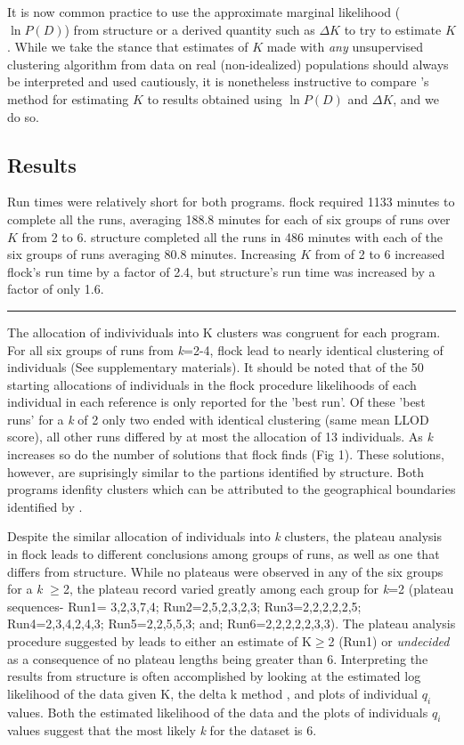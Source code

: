  

It is now common practice to use the approximate marginal likelihood ($\ln P(D)$) from {\sc structure}
or a derived quantity such as $\Delta K$ \citep{Evannoetal2005} to try to estimate $K$.
While we take the stance that estimates of $K$ made with {\em any} unsupervised clustering algorithm
from data on real (non-idealized) populations should always be interpreted and used
cautiously, it is nonetheless instructive to compare \citet{Duc&Tur2012}'s method for
estimating $K$ to results obtained using $\ln P(D)$ and $\Delta K$, and we do so. 


\subsection*{Results} 
Run times were relatively short for both programs. {\sc flock} 
required 1133 minutes to complete all the runs, averaging 188.8 minutes for 
each of six groups of runs over $K$ from 2 to 6. {\sc structure} completed all the runs in 
486 minutes with each of the six groups of runs averaging 80.8 minutes. Increasing
$K$ from of 2 to 6 increased {\sc flock}'s run time by a factor of 2.4, but {\sc structure}'s
run time was increased by a factor of only 1.6.  
\hrule

The allocation of indivividuals into K clusters was congruent for each program. For all six groups 
of runs from \textit{k}=2-4, {\sc flock} lead to nearly identical clustering of individuals 
(See supplementary materials). It should be noted
that of the 50 starting allocations of individuals in the {\sc flock} procedure likelihoods of each individual in 
each reference is only reported for the 
 'best run'. Of these 'best runs' for a \textit{k} of 2 only two  
ended with identical clustering (same mean LLOD score), all other runs 
differed by at most the allocation of 13 individuals. As \textit{k} increases so do the number of solutions
that {\sc flock} finds (Fig 1). These solutions, however, are suprisingly similar to
 the partions identified by {\sc structure}. Both programs idenfity clusters 
which can be attributed to the geographical boundaries identified by \citet{Garzaetal_norcal}.

Despite the similar allocation of individuals into \textit{k} clusters, the 
plateau analysis in {\sc flock} leads to different conclusions among groups of runs, as well as 
one that differs from {\sc structure}. While no plateaus were observed in any of the six groups 
for a \textit{k} $\geq$2, the plateau record varied greatly among each
 group for \textit{k}=2 (plateau  sequences- Run1= 3,2,3,7,4; Run2=2,5,2,3,2,3; Run3=2,2,2,2,2,5; 
Run4=2,3,4,2,4,3; Run5=2,2,5,5,3; and; Run6=2,2,2,2,2,3,3). The plateau analysis 
procedure suggested by \citet{Duc&Tur2012} leads to 
either an estimate of K$\geq$2 (Run1) or \textit{undecided} as a consequence of no plateau 
lengths being greater than 6. Interpreting the results from {\sc structure} is often accomplished by 
looking at the estimated log likelihood of the data given K, the delta k method \citep{Evannoetal2005}, and plots of 
individual \textit{$q_i$} values. Both the estimated likelihood of the data
and the plots of individuals \textit{$q_i$} values suggest that 
the most likely \textit{k} for the dataset is 6. 

